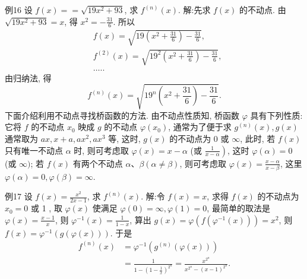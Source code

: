 例16 设 $f(x)==\sqrt{19 x^2+93}$, 求 $f^{(n)}(x)$.
解:先求 $f(x)$ 的不动点.
由 $\sqrt{19 x^2+93}=x$, 得 $x^2=-\frac{31}{6}$. 所以
$$
\begin{aligned}
& f(x)=\sqrt{19\left(x^2+\frac{31}{6}\right)-\frac{31}{6}}, \\
& f^{(2)}(x)=\sqrt{19^2\left(x^2+\frac{31}{6}\right)-\frac{31}{6}}, \\
& \ldots . .
\end{aligned}
$$
由归纳法, 得
$$
f^{(n)}(x)=\sqrt{19^n\left(x^2+\frac{31}{6}\right)-\frac{31}{6}} .
$$
下面介绍利用不动点寻找桥函数的方法.
由不动点性质知, 桥函数 $\varphi$ 具有下列性质: 它将 $f$ 的不动点 $x_0$ 映成 $g$ 的不动点 $\varphi\left(x_0\right)$, 通常为了便于求 $g^{(n)}(x), g(x)$ 通常取为 $a x, x+a, a x^2, a x^3$ 等, 这时, $g(x)$ 的不动点为 0 或 $\infty$, 此时, 若 $f(x)$ 只有唯一不动点 $\alpha$ 时, 则可考虑取 $\varphi(x)=x-\alpha$ (或 $\left.\frac{1}{x-\alpha}\right)$, 这时 $\varphi(\alpha)=0$ (或 $\infty)$; 若 $f(x)$ 有两个不动点 $\alpha 、 \beta(\alpha \neq \beta)$, 则可考虑取 $\varphi(x)=\frac{x-\alpha}{x-\beta}$, 这里 $\varphi(\alpha)=0, \varphi(\beta)=\infty$.



例17 设 $f(x)=\frac{x^2}{2 x-1}$, 求 $f^{(n)}(x)$.
解:令 $f(x)=x$, 求得 $f(x)$ 的不动点为 $x_0=0$ 或 1 , 取 $\varphi(x)$ 使满足 $\varphi(0)=\infty, \varphi(1)=0$, 最简单的取法是 $\varphi(x)=\frac{x-1}{x}$, 则 $\varphi^{-1}(x)=\frac{1}{1-x}$, 算出 $g(x)=\varphi\left(f\left(\varphi^{-1}(x)\right)\right)=x^2$, 则 $f(x)=\varphi^{-1}(g(\varphi(x)))$.
于是
$$
\begin{aligned}
f^{(n)}(x) & =\varphi^{-1}\left(g^{(n)}(\varphi(x))\right) \\
& =\frac{1}{1-\left(1-\frac{1}{x}\right)^{2^n}}=\frac{x^{2^n}}{x^{2^n}-(x-1)^{2^n}} .
\end{aligned}
$$



